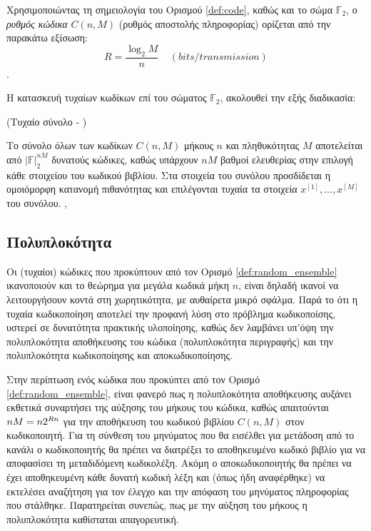 Χρησιμοποιώντας τη σημειολογία του Ορισμού \ref{def:code}, καθώς και το σώμα $\mathbb{F}_2$, ο \textit{ρυθμός κώδικα} $C(n,M)$ (ρυθμός αποστολής πληροφορίας) ορίζεται από την παρακάτω εξίσωση:
\begin{equation}
R=\frac{\log_{2}M}{n}\;\;\;\;(bits/transmission)
\label{eq: code rate}
\end{equation}
\cite{cover2012elements}.

\vspace{5mm}
Η κατασκευή τυχαίων κωδίκων επί του σώματος $\mathbb{F}_2$, ακολουθεί την εξής διαδικασία:
\begin{definition}{(Τυχαίο σύνολο  - )}

Το σύνολο όλων των κωδίκων $C(n,M)$ μήκους $n$ και πληθυκότητας $M$ αποτελείται από $|\mathbb{F}|_2^{nM}$ δυνατούς κώδικες, καθώς υπάρχουν $nM$ βαθμοί ελευθερίας στην επιλογή κάθε στοιχείου του κωδικού βιβλίου. Στα στοιχεία του συνόλου προσδίδεται η ομοιόμορφη κατανομή πιθανότητας και επιλέγονται τυχαία τα στοιχεία $x^{[1]},...,x^{[M]}$ του συνόλου. \cite{richardson2008modern},\cite{shannon1948mathematical}
\label{def:random_ensemble}
\end{definition}

\subsection{Πολυπλοκότητα}
Oι (τυχαίοι) κώδικες που προκύπτουν από τον Ορισμό \ref{def:random_ensemble} ικανοποιούν και το θεώρημα  για μεγάλα κωδικά μήκη $n$, είναι δηλαδή ικανοί να λειτουργήσουν κοντά στη χωρητικότητα, με αυθαίρετα μικρό σφάλμα. Παρά το ότι η τυχαία κωδικοποίηση αποτελεί την προφανή λύση στο πρόβλημα κωδικοποίσης, υστερεί σε δυνατότητα πρακτικής υλοποίησης, καθώς δεν λαμβάνει υπ'όψη την πολυπλοκότητα αποθήκευσης του κώδικα (πολυπλοκότητα περιγραφής) και την πολυπλοκότητα κωδικοποίησης και αποκωδικοποίησης.

Στην περίπτωση ενός κώδικα που προκύπτει από τον Ορισμό \ref{def:random_ensemble}, είναι φανερό πως η πολυπλοκότητα αποθήκευσης αυξάνει εκθετικά συναρτήσει της αύξησης του μήκους του κώδικα, καθώς απαιτούνται $nM = n\*2^{Rn}$  για την αποθήκευση του κωδικού βιβλίου $C(n,M)$ στον κωδικοποιητή. Για τη σύνθεση του μηνύματος που θα εισέλθει για μετάδοση από το κανάλι ο κωδικοποιητής θα πρέπει να διατρέξει το αποθηκευμένο κωδικό βιβλίο για να αποφασίσει τη μεταδιδόμενη κωδικολέξη. Ακόμη ο αποκωδικοποιητής θα πρέπει να έχει αποθηκευμένη κάθε δυνατή κωδική λέξη και (όπως ήδη αναφέρθηκε) να εκτελέσει αναζήτηση για τον έλεγχο και την απόφαση του μηνύματος πληροφορίας που στάλθηκε. Παρατηρείται συνεπώς, πως με την αύξηση του μήκους  η πολυπλοκότητα καθίσταται απαγορευτική.

